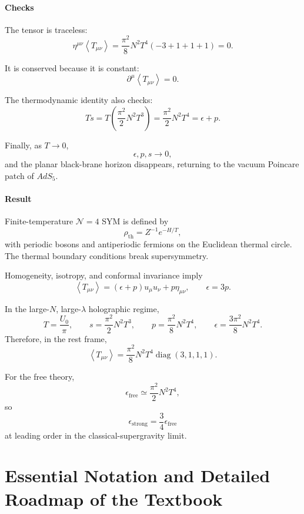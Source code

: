 \documentclass[
  10pt,
  a4paper,
  openany]{book}
\begin{document}
\subsubsection{Checks}\label{checks-39}

The tensor is traceless: \[
\eta^{\mu\nu}
\left\langle T_{\mu\nu}\right\rangle
=
\frac{\pi^2}{8}N^2T^4
(-3+1+1+1)
=0.
\]

It is conserved because it is constant: \[
\partial^\mu
\left\langle T_{\mu\nu}\right\rangle
=0.
\]

The thermodynamic identity also checks: \[
Ts
=
T\left(
\frac{\pi^2}{2}N^2T^3
\right)
=
\frac{\pi^2}{2}N^2T^4
=
\epsilon+p.
\]

Finally, as \(T\to0\), \[
\epsilon,p,s\longrightarrow0,
\] and the planar black-brane horizon disappears, returning to the
vacuum Poincare patch of \(AdS_5\).

\subsubsection{Result}\label{result-47}

Finite-temperature \(\mathcal N=4\) SYM is defined by \[
\rho_{\mathrm{th}}
=Z^{-1}e^{-H/T},
\] with periodic bosons and antiperiodic fermions on the Euclidean
thermal circle. The thermal boundary conditions break supersymmetry.

Homogeneity, isotropy, and conformal invariance imply \[
\boxed{
\left\langle T_{\mu\nu}\right\rangle
=
(\epsilon+p)u_\mu u_\nu
+p\eta_{\mu\nu},
\qquad
\epsilon=3p
}.
\]

In the large-\(N\), large-\(\lambda\) holographic regime, \[
\boxed{
T=\frac{U_0}{\pi},
\qquad
s=\frac{\pi^2}{2}N^2T^3,
\qquad
p=\frac{\pi^2}{8}N^2T^4,
\qquad
\epsilon=\frac{3\pi^2}{8}N^2T^4
}.
\] Therefore, in the rest frame, \[
\boxed{
\left\langle T_{\mu\nu}\right\rangle
=
\frac{\pi^2}{8}N^2T^4
\operatorname{diag}(3,1,1,1)
}.
\]

For the free theory, \[
\epsilon_{\mathrm{free}}
\simeq
\frac{\pi^2}{2}N^2T^4,
\] so \[
\boxed{
\epsilon_{\mathrm{strong}}
=\frac34\epsilon_{\mathrm{free}}
}
\] at leading order in the classical-supergravity limit.

\appendix

\chapter{Essential Notation and Detailed Roadmap of the
Textbook}\label{essential-notation-and-detailed-roadmap-of-the-textbook}
\end{document}
